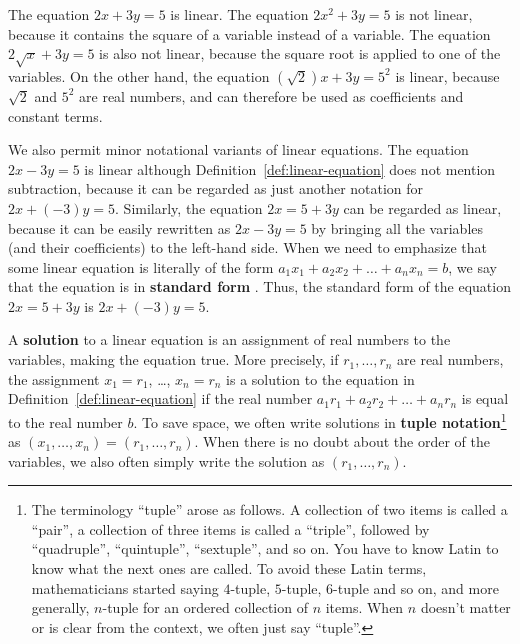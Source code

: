 \begin{solution}
  The equation $2x+3y=5$ is linear. The equation $2x^2+3y=5$ is not
  linear, because it contains the square of a variable instead of a
  variable.  The equation $2\sqrt{x} + 3y = 5$ is also not linear,
  because the square root is applied to one of the variables. On the
  other hand, the equation $(\sqrt{2}) x + 3y = 5^2$ is linear,
  because $\sqrt{2}$ and $5^2$ are real numbers, and can
  therefore be used as coefficients and constant terms.
\end{solution}

We also permit minor notational variants of linear equations. The
equation $2x-3y=5$ is linear although
Definition~\ref{def:linear-equation} does not mention subtraction,
because it can be regarded as just another notation for
$2x+(-3)y = 5$. Similarly, the equation $2x=5+3y$ can be regarded as
linear, because it can be easily rewritten as $2x-3y=5$ by bringing
all the variables (and their coefficients) to the left-hand side.
When we need to emphasize that some linear equation is literally of
the form $a_1x_1 + a_2x_2 + \ldots + a_nx_n = b$, we say that the
equation is in \textbf{standard form}%
%
. Thus, the standard form of
the equation $2x=5+3y$ is $2x+(-3)y=5$.

A \textbf{solution} to a linear
equation is an assignment of real numbers to the variables, making the
equation true. More precisely, if $r_1,\ldots,r_n$ are real numbers,
the assignment $x_1=r_1$, \ldots, $x_n=r_n$ is a solution to the
equation in Definition~\ref{def:linear-equation} if the real number
$a_1r_1 + a_2r_2 + \ldots + a_nr_n$ is equal to the real number
$b$. To save space, we often write solutions in \textbf{tuple
  notation}\footnote{The terminology ``tuple'' arose as
  follows. A collection of two items is called a ``pair'', a
  collection of three items is called a ``triple'', followed by
  ``quadruple'', ``quintuple'', ``sextuple'', and so on. You have to
  know Latin to know what the next ones are called. To avoid these
  Latin terms, mathematicians started saying $4$-tuple, $5$-tuple,
  $6$-tuple and so on, and more generally, $n$-tuple for an ordered
  collection of $n$ items. When $n$ doesn't matter or is clear from
  the context, we often just say ``tuple''.}  as
$(x_1,\ldots,x_n) = (r_1,\ldots,r_n)$. When there is no doubt about
the order of the variables, we also often simply write the solution as
$(r_1,\ldots,r_n)$.

